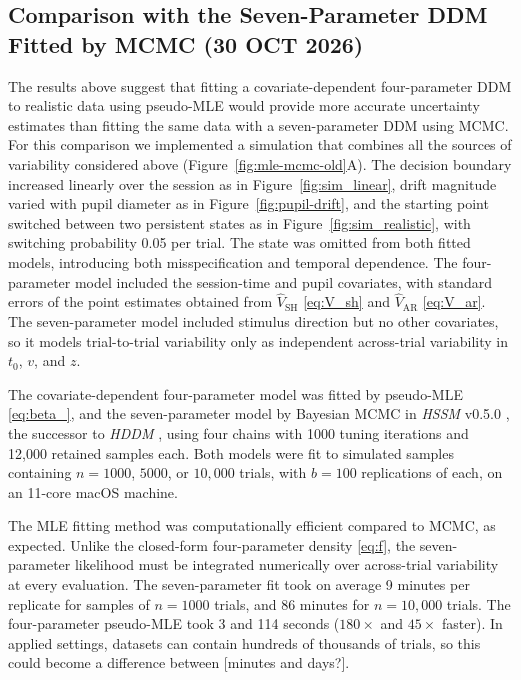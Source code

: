 \documentclass[00-main.tex]{subfiles}
\begin{document}
\subsection*{Comparison with the Seven-Parameter DDM Fitted by MCMC (30 OCT 2026)}
The results above suggest that fitting a covariate-dependent four-parameter DDM to realistic data using pseudo-MLE would provide more accurate uncertainty estimates than fitting the same data with a seven-parameter DDM using MCMC.  For this comparison we implemented a simulation that combines all the sources of variability considered above (Figure~\ref{fig:mle-mcmc-old}A). The decision boundary increased linearly over the session as in Figure~\ref{fig:sim_linear}, drift magnitude varied with pupil diameter as in Figure~\ref{fig:pupil-drift}, and the starting point switched between two persistent states as in Figure~\ref{fig:sim_realistic}, with switching probability 0.05 per trial. The state was omitted from both fitted models, introducing both misspecification and temporal dependence. The four-parameter model included the session-time and pupil covariates, with standard errors of the point estimates obtained from $\widehat{V}_\text{SH}$ \eqref{eq:V_sh} and $\widehat{V}_\text{AR}$ \eqref{eq:V_ar}.  The seven-parameter model included stimulus direction but no other covariates, so it models trial-to-trial variability only as independent across-trial variability in $t_0$, $v$, and $z$.

The covariate-dependent four-parameter model was fitted by pseudo-MLE \eqref{eq:beta_}, and the seven-parameter model by Bayesian MCMC in \emph{HSSM} v0.5.0 \citep{fengler_hssm_2026}, the successor to \emph{HDDM} \citep{wiecki_hddm_2013}, using four chains with 1000 tuning iterations and 12{,}000 retained samples each. Both models were fit to simulated samples containing  $n=1000$, $5000$, or $10,000$ trials, with  $b=100$ replications of each, on an 11-core macOS machine.

The MLE fitting method was computationally efficient compared to MCMC, as expected. Unlike the closed-form four-parameter density \eqref{eq:f}, the seven-parameter likelihood must be integrated numerically over across-trial variability at every evaluation. The seven-parameter fit took on average 9 minutes per replicate for samples of $n=1000$ trials, and 86 minutes for $n=10{,}000$ trials. The four-parameter pseudo-MLE took 3 and 114 seconds ($180\times$ and $45\times$ faster). In applied settings, datasets can contain hundreds of thousands of trials, so this could become a difference between [minutes and days?].
\end{document}
